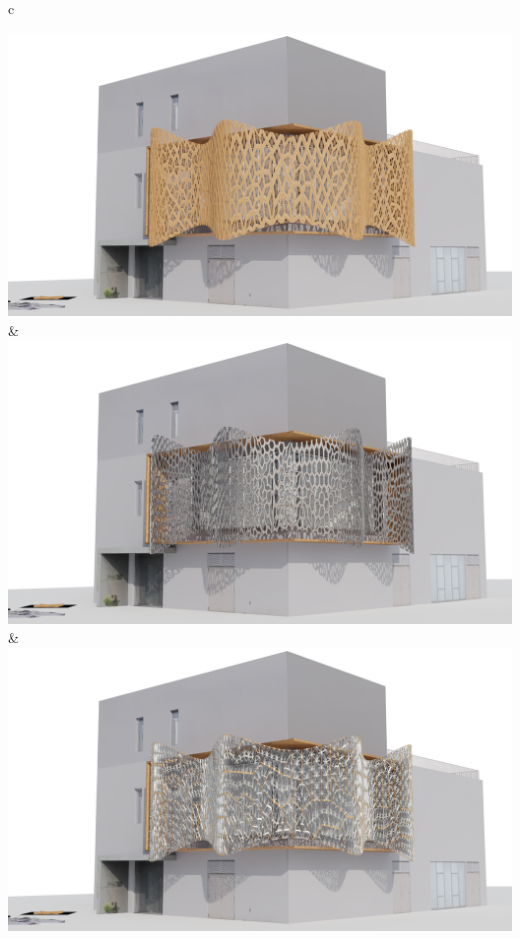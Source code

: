 \begin{linenumbers}
\begin{table}[!htb]
\begin{tabular}{c}
\begin{minipage}{\textwidth}
\begin{tabularx}
          {\includegraphics[width=1\linewidth]{Images/Pattern 1/0009}} &
          {\includegraphics[width=1\linewidth]{Images/Pattern 2/0009}} &
          {\includegraphics[width=1\linewidth]{Images/Pattern 3/0009}} \\
        \bottomrule
    \end{tabularx}
        \end{minipage}
    \end{tabular}
    \end{table}




\end{linenumbers}
